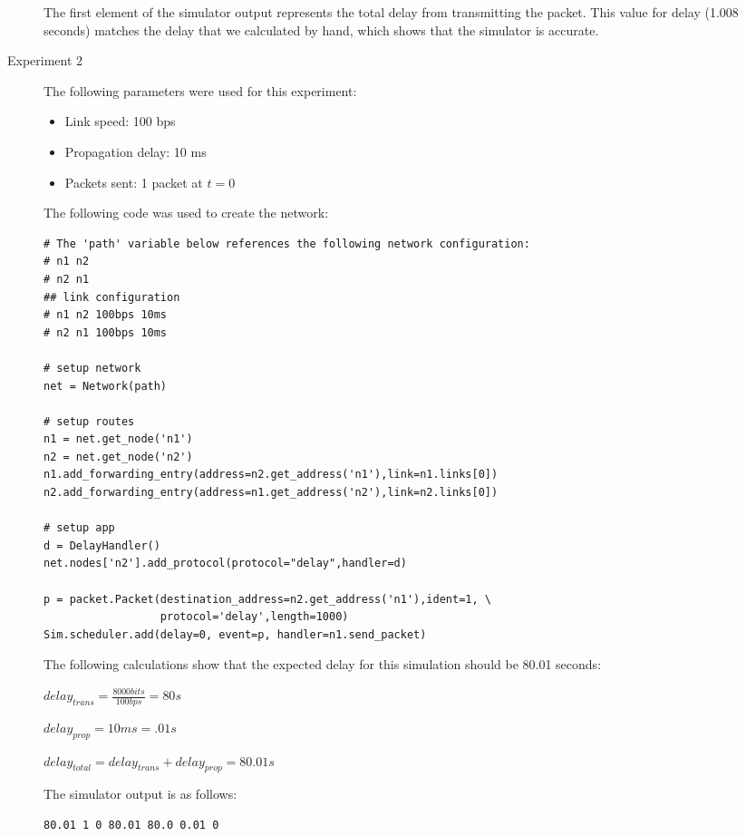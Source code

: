 \documentclass[11pt]{article}
\begin{document}
\begin{description}
The first element of the simulator output represents the total delay from transmitting the packet. This value for delay (1.008 seconds) matches the delay that we calculated by hand, which shows that the simulator is accurate.

\item[Experiment 2] \hfill \break
The following parameters were used for this experiment:

\begin{itemize}
\item Link speed: 100 bps
\item Propagation delay: 10 ms
\item Packets sent: 1 packet at $t = 0$
\end{itemize}

\medskip

The following code was used to create the network:

\medskip

\begin{lstlisting}
# The 'path' variable below references the following network configuration:
# n1 n2
# n2 n1
## link configuration
# n1 n2 100bps 10ms
# n2 n1 100bps 10ms

# setup network
net = Network(path)

# setup routes
n1 = net.get_node('n1')
n2 = net.get_node('n2')
n1.add_forwarding_entry(address=n2.get_address('n1'),link=n1.links[0])
n2.add_forwarding_entry(address=n1.get_address('n2'),link=n2.links[0])

# setup app
d = DelayHandler()
net.nodes['n2'].add_protocol(protocol="delay",handler=d)

p = packet.Packet(destination_address=n2.get_address('n1'),ident=1, \
                  protocol='delay',length=1000)
Sim.scheduler.add(delay=0, event=p, handler=n1.send_packet)
\end{lstlisting}

The following calculations show that the expected delay for this simulation should be 80.01 seconds:

$delay_{trans} = \frac{8000 bits}{100 bps} = 80s $

$delay_{prop} = 10ms = .01s$

$delay_{total} = delay_{trans} + delay_{prop} = 80.01s $

\medskip

The simulator output is as follows:

\medskip

\begin{lstlisting}
80.01 1 0 80.01 80.0 0.01 0
\end{lstlisting}


\end{description}
\end{document}
